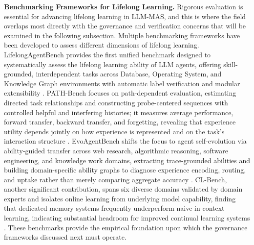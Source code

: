\documentclass[11pt]{article}
\begin{document}
\textbf{Benchmarking Frameworks for Lifelong Learning.} Rigorous evaluation is essential for advancing lifelong learning in LLM-MAS, and this is where the field overlaps most directly with the governance and verification concerns that will be examined in the following subsection. Multiple benchmarking frameworks have been developed to assess different dimensions of lifelong learning. LifelongAgentBench provides the first unified benchmark designed to systematically assess the lifelong learning ability of LLM agents, offering skill-grounded, interdependent tasks across Database, Operating System, and Knowledge Graph environments with automatic label verification and modular extensibility \cite{ref171}. PATH-Bench focuses on path-dependent evaluation, estimating directed task relationships and constructing probe-centered sequences with controlled helpful and interfering histories; it measures average performance, forward transfer, backward transfer, and forgetting, revealing that experience utility depends jointly on how experience is represented and on the task's interaction structure \cite{ref178}. EvoAgentBench shifts the focus to agent self-evolution via ability-guided transfer across web research, algorithmic reasoning, software engineering, and knowledge work domains, extracting trace-grounded abilities and building domain-specific ability graphs to diagnose experience encoding, routing, and uptake rather than merely comparing aggregate accuracy \cite{ref179}. CL-Bench, another significant contribution, spans six diverse domains validated by domain experts and isolates online learning from underlying model capability, finding that dedicated memory systems frequently underperform naive in-context learning, indicating substantial headroom for improved continual learning systems \cite{ref180}. These benchmarks provide the empirical foundation upon which the governance frameworks discussed next must operate.
\end{document}
